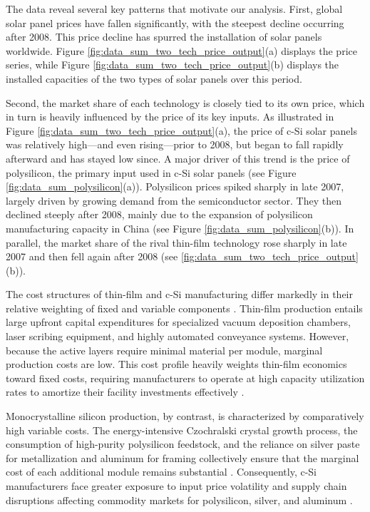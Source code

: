 \documentclass[12pt]{article}
\begin{document}
The data reveal several key patterns that motivate our analysis. First, global solar panel prices have fallen significantly, with the steepest decline occurring after 2008. This price decline has spurred the installation of solar panels worldwide. Figure \ref{fig:data_sum_two_tech_price_output}(a) displays the price series, while Figure \ref{fig:data_sum_two_tech_price_output}(b) displays the installed capacities of the two types of solar panels over this period.

Second, the market share of each technology is closely tied to its own price, which in turn is heavily influenced by the price of its key inputs. As illustrated in Figure \ref{fig:data_sum_two_tech_price_output}(a), the price of c-Si solar panels was relatively high—and even rising—prior to 2008, but began to fall rapidly afterward and has stayed low since.   A major driver of this trend is the price of polysilicon, the primary input used in c-Si solar panels (see Figure \ref{fig:data_sum_polysilicon}(a)). Polysilicon prices spiked sharply in late 2007, largely driven by growing demand from the semiconductor sector. They then declined steeply after 2008, mainly due to the expansion of polysilicon manufacturing capacity in China (see Figure \ref{fig:data_sum_polysilicon}(b)).  In parallel, the market share of the rival thin-film technology rose sharply in late 2007 and then fell again after 2008 (see \ref{fig:data_sum_two_tech_price_output}(b)).


The cost structures of thin-film and c-Si manufacturing differ markedly in their relative weighting of fixed and variable components \citep{Powell2012, Powell2013}. Thin-film production entails large upfront capital expenditures for specialized vacuum deposition chambers, laser scribing equipment, and highly automated conveyance systems. However, because the active layers require minimal material per module, marginal production costs are low. This cost profile heavily weights thin-film economics toward fixed costs, requiring manufacturers to operate at high capacity utilization rates to amortize their facility investments effectively \citep{Goodrich2013}.
 
Monocrystalline silicon production, by contrast, is characterized by comparatively high variable costs. The energy-intensive Czochralski crystal growth process, the consumption of high-purity polysilicon feedstock, and the reliance on silver paste for metallization and aluminum for framing collectively ensure that the marginal cost of each additional module remains substantial \citep{Powell2012, Woodhouse2019}. Consequently, c-Si manufacturers face greater exposure to input price volatility and supply chain disruptions affecting commodity markets for polysilicon, silver, and aluminum \citep{ITRPV2024}.
\end{document}
